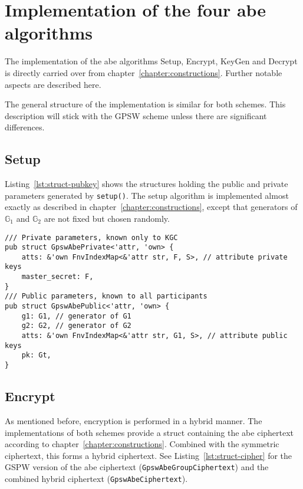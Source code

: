 \section{Implementation of the four \acrshort*{abe} algorithms}\label{sec:abe-algs-impl}

The implementation of the \acrshort{abe} algorithms Setup, Encrypt, KeyGen and Decrypt is directly carried over from chapter~\ref{chapter:constructions}.
Further notable aspects are described here.

The general structure of the implementation is similar for both schemes. 
This description will stick with the GPSW scheme unless there are significant differences.

\subsection{Setup}
Listing~\ref{lst:struct-pubkey} shows the structures holding the public and private parameters generated by \texttt{setup()}.
The setup algorithm is implemented almost exactly as described in chapter~\ref{chapter:constructions}, except that generators of $\mathbb{G}_1$ and $\mathbb{G}_2$ are not fixed but chosen randomly.

\begin{lstlisting}[float=h,caption={Private and public system parameters structs for GPSW},label={lst:struct-pubkey}]
/// Private parameters, known only to KGC
pub struct GpswAbePrivate<'attr, 'own> {
    atts: &'own FnvIndexMap<&'attr str, F, S>, // attribute private keys
    master_secret: F,
}
/// Public parameters, known to all participants
pub struct GpswAbePublic<'attr, 'own> {
    g1: G1, // generator of G1
    g2: G2, // generator of G2
    atts: &'own FnvIndexMap<&'attr str, G1, S>, // attribute public keys
    pk: Gt,
}
\end{lstlisting}

\subsection{Encrypt}
As mentioned before, encryption is performed in a hybrid manner.
The implementations of both schemes provide a struct containing the \acrshort{abe} ciphertext according to chapter~\ref{chapter:constructions}.
Combined with the symmetric ciphertext, this forms a hybrid ciphertext.
See Listing~\ref{lst:struct-cipher} for the GSPW version of the \acrshort{abe} ciphertext (\verb+GpswAbeGroupCiphertext+) and the combined hybrid ciphertext (\verb+GpswAbeCiphertext+).

